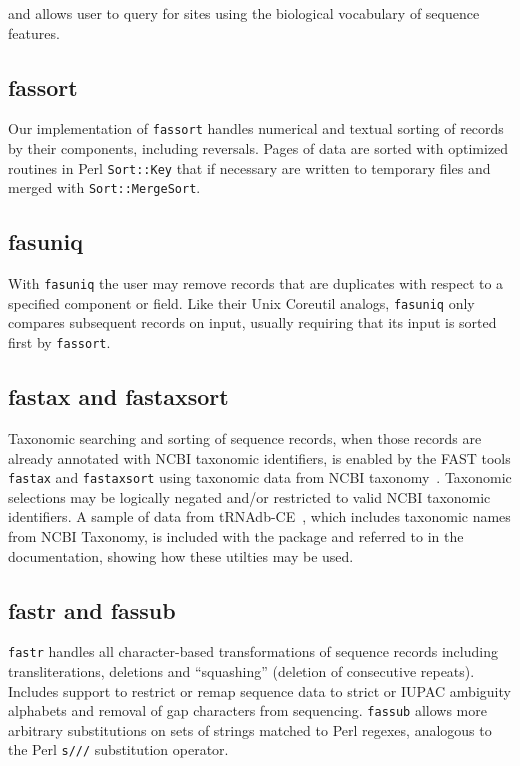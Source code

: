 \documentclass{frontiersSCNS} %
\begin{document}
 and allows user to
query for sites using the biological vocabulary of sequence features.

\subsection{fassort}

Our implementation of {\tt fassort} handles numerical and textual
sorting of records by their components, including reversals. Pages of data are sorted with
optimized routines in Perl {\tt Sort::Key} that if necessary are
written to temporary files and merged with {\tt Sort::MergeSort}.

\subsection{fasuniq}

With {\tt fasuniq} the user may remove records that are duplicates
with respect to a specified component or field. Like their Unix
Coreutil analogs, {\tt fasuniq} only compares subsequent records on
input, usually requiring that its input is sorted first by {\tt fassort}.

\subsection{fastax and fastaxsort}

Taxonomic searching and sorting of sequence records, when those
records are already annotated with NCBI taxonomic identifiers, is
enabled by the FAST tools {\tt fastax} and {\tt fastaxsort} using
taxonomic data from NCBI taxonomy~\citep{Benson2009,
  Sayers2009}. Taxonomic selections may be logically negated and/or
restricted to valid NCBI taxonomic identifiers. A sample
of data from tRNAdb-CE~\citep{10.3389/fgene.2014.00114}, which
includes taxonomic names from NCBI Taxonomy, is included with the
package and referred to in the documentation, showing how these
utilties may be used.

\subsection{fastr and fassub} 

{\tt fastr} handles all character-based transformations of sequence
records including transliterations, deletions and ``squashing''
(deletion of consecutive repeats). Includes support to restrict or remap 
sequence data to strict or IUPAC ambiguity alphabets and removal of
gap characters from sequencing. {\tt fassub} allows more arbitrary
substitutions on sets of strings matched to Perl regexes, analogous to
the Perl {\tt s///} substitution operator.
\end{document}
